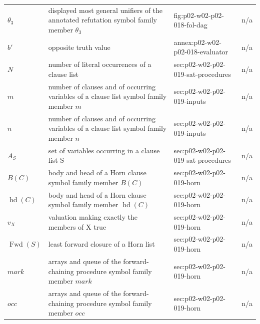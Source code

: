 \begin{longtable}{@{}p{}p{}p{}p{}@{}}
\(\theta_3\) & displayed most general unifiers of the annotated refutation symbol family member \(\theta_3\) & fig:\allowbreak{}p02-\allowbreak{}w02-\allowbreak{}p02-\allowbreak{}018-\allowbreak{}fol-\allowbreak{}dag & n/a \\
\(b'\) & opposite truth value & annex:\allowbreak{}p02-\allowbreak{}w02-\allowbreak{}p02-\allowbreak{}018-\allowbreak{}evaluator & n/a \\
\(N\) & number of literal occurrences of a clause list & sec:\allowbreak{}p02-\allowbreak{}w02-\allowbreak{}p02-\allowbreak{}019-\allowbreak{}sat-\allowbreak{}procedures & n/a \\
\(m\) & number of clauses and of occurring variables of a clause list symbol family member \(m\) & sec:\allowbreak{}p02-\allowbreak{}w02-\allowbreak{}p02-\allowbreak{}019-\allowbreak{}inputs & n/a \\
\(n\) & number of clauses and of occurring variables of a clause list symbol family member \(n\) & sec:\allowbreak{}p02-\allowbreak{}w02-\allowbreak{}p02-\allowbreak{}019-\allowbreak{}inputs & n/a \\
\(A_S\) & set of variables occurring in a clause list S & sec:\allowbreak{}p02-\allowbreak{}w02-\allowbreak{}p02-\allowbreak{}019-\allowbreak{}sat-\allowbreak{}procedures & n/a \\
\(B(C)\) & body and head of a Horn clause symbol family member \(B(C)\) & sec:\allowbreak{}p02-\allowbreak{}w02-\allowbreak{}p02-\allowbreak{}019-\allowbreak{}horn & n/a \\
\(\operatorname{hd}(C)\) & body and head of a Horn clause symbol family member \(\operatorname{hd}(C)\) & sec:\allowbreak{}p02-\allowbreak{}w02-\allowbreak{}p02-\allowbreak{}019-\allowbreak{}horn & n/a \\
\(v_X\) & valuation making exactly the members of X true & sec:\allowbreak{}p02-\allowbreak{}w02-\allowbreak{}p02-\allowbreak{}019-\allowbreak{}horn & n/a \\
\(\operatorname{Fwd}(S)\) & least forward closure of a Horn list & sec:\allowbreak{}p02-\allowbreak{}w02-\allowbreak{}p02-\allowbreak{}019-\allowbreak{}horn & n/a \\
\(\mathit{mark}\) & arrays and queue of the forward-chaining procedure symbol family member \(\mathit{mark}\) & sec:\allowbreak{}p02-\allowbreak{}w02-\allowbreak{}p02-\allowbreak{}019-\allowbreak{}horn & n/a \\
\(\mathit{occ}\) & arrays and queue of the forward-chaining procedure symbol family member \(\mathit{occ}\) & sec:\allowbreak{}p02-\allowbreak{}w02-\allowbreak{}p02-\allowbreak{}019-\allowbreak{}horn & n/a \\

\end{longtable}
